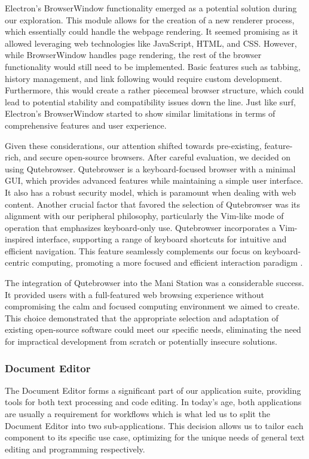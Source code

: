 \documentclass[letterpaper,twocolumn,10pt]{article}
\begin{document}
Electron's BrowserWindow functionality emerged as a potential solution during our exploration. This module allows for the creation of a new renderer process, which essentially could handle the webpage rendering. It seemed promising as it allowed leveraging web technologies like JavaScript, HTML, and CSS. However, while BrowserWindow handles page rendering, the rest of the browser functionality would still need to be implemented. Basic features such as tabbing, history management, and link following would require custom development. Furthermore, this would create a rather piecemeal browser structure, which could lead to potential stability and compatibility issues down the line. Just like surf, Electron's BrowserWindow started to show similar limitations in terms of comprehensive features and user experience.

Given these considerations, our attention shifted towards pre-existing, feature-rich, and secure open-source browsers. After careful evaluation, we decided on using Qutebrowser. Qutebrowser is a keyboard-focused browser with a minimal GUI, which provides advanced features while maintaining a simple user interface. It also has a robust security model, which is paramount when dealing with web content. Another crucial factor that favored the selection of Qutebrowser was its alignment with our peripheral philosophy, particularly the Vim-like mode of operation that emphasizes keyboard-only use. Qutebrowser incorporates a Vim-inspired interface, supporting a range of keyboard shortcuts for intuitive and efficient navigation. This feature seamlessly complements our focus on keyboard-centric computing, promoting a more focused and efficient interaction paradigm \cite{qutebrowser}.

The integration of Qutebrowser into the Mani Station was a considerable success. It provided users with a full-featured web browsing experience without compromising the calm and focused computing environment we aimed to create. This choice demonstrated that the appropriate selection and adaptation of existing open-source software could meet our specific needs, eliminating the need for impractical development from scratch or potentially insecure solutions.
\subsubsection{Document Editor}
The Document Editor forms a significant part of our application suite, providing tools for both text processing and code editing. In today’s age, both applications are usually a requirement for workflows which is what led us to split the Document Editor into two sub-applications. This decision allows us to tailor each component to its specific use case, optimizing for the unique needs of general text editing and programming respectively.
\end{document}

